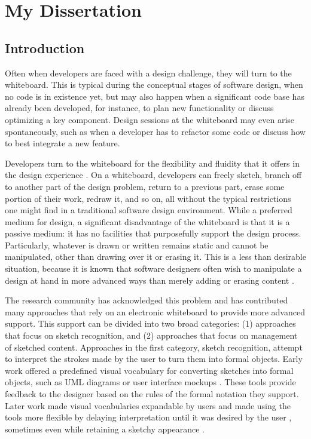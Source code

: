 \chapter{My Dissertation}
\label{chapter:thesis}

\section{Introduction}

Often when developers are faced with a design challenge, they will turn to the whiteboard.  This is typical during the conceptual stages of software design, when no code is in existence yet, but may also happen when a significant code base has already been developed, for instance, to plan new functionality or discuss optimizing a key component. Design sessions at the whiteboard may even arise spontaneously, such as when a developer has to refactor some code or discuss how to best integrate a new feature.

Developers turn to the whiteboard for the flexibility and fluidity that it offers in the design experience \cite{cherubini2007let}. On a whiteboard, developers can freely sketch, branch off to another part of the design problem, return to a previous part, erase some portion of their work, redraw it, and so on, all without the typical restrictions one might find in a traditional software design environment. 
While a preferred medium for design, a significant disadvantage of the whiteboard is that it is a passive medium: it has no facilities that purposefully support the design process. Particularly, whatever is drawn or written remains static and cannot be manipulated, other than drawing over it or erasing it. This is a less than desirable situation, because it is known that software designers often wish to manipulate a design at hand in more advanced ways than merely adding or erasing content \cite{dekel2007notation}.

The research community has acknowledged this problem and has contributed many approaches that rely on an electronic whiteboard to provide more advanced support. This support can be divided into two broad categories: (1) approaches that focus on sketch recognition, and (2) approaches that focus on management of sketched content. Approaches in the first category, sketch recognition, attempt to interpret the strokes made by the user to turn them into formal  objects. Early work offered a predefined visual vocabulary for converting sketches into formal objects, such as UML diagrams \cite{chen2008sumlow} or user interface mockups \cite{landay1995interactive}. These tools provide feedback to the designer based on the rules of the formal notation they support. Later work made visual vocabularies expandable by users \cite{hammond2006ladder} and made using the tools more flexible by delaying interpretation until it was desired by the user \cite{damm2000supporting}, sometimes even while retaining a sketchy appearance \cite{chung2005inkkit}.

